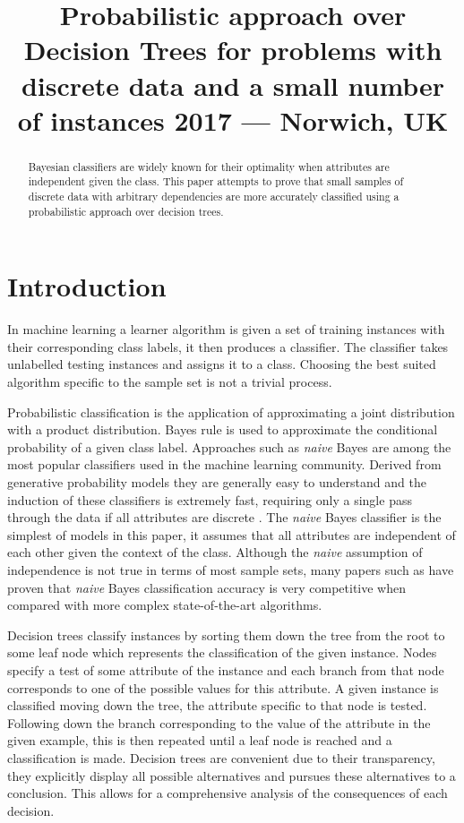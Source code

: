 \documentclass{cmppgr}
\title{Probabilistic approach over Decision Trees for problems with discrete data and a small number of instances 2017 --- Norwich, UK}
\begin{document}
\maketitle

\begin{abstract}

Bayesian classifiers are widely known for their optimality when attributes are independent given the class. This paper attempts to prove that small samples of discrete data with arbitrary dependencies are more accurately classified using a probabilistic approach over decision trees. 


\end{abstract}


\section{Introduction}

In machine learning a learner algorithm is given a set of training instances with their corresponding class labels, it then produces a classifier. The classifier takes unlabelled testing instances and assigns it to a class. Choosing the best suited algorithm specific to the sample set is not a trivial process.

Probabilistic classification is the application of approximating a joint distribution with a product distribution. Bayes rule is used to approximate the conditional probability of a given class label. Approaches such as \textit{naive} Bayes are among the most popular classifiers used in the machine learning community. Derived from generative probability models they are generally easy to understand and the induction of these classifiers is extremely fast, requiring only a single pass through the data if all attributes are discrete \cite{kohavi1996scaling}. The \textit{naive} Bayes classifier is the simplest of models in this paper, it assumes that all attributes are independent of each other given the context of the class. Although the \textit{naive} assumption of independence is not true in terms of most sample sets, many papers such as \cite{domingos1997optimality} have proven that \textit{naive} Bayes classification accuracy is very competitive when compared with more complex state-of-the-art algorithms. 

 

Decision trees classify instances by sorting them down the tree from the root to some leaf node which represents the classification of the given instance. Nodes specify a test of some attribute of the instance and each branch from that node corresponds to one of the possible values for this attribute. A given instance is classified moving down the tree, the attribute specific to that node is tested. Following down the branch corresponding to the value of the attribute in the given example, this is then repeated until a leaf node is reached and a classification is made. Decision trees are convenient due to their transparency, they explicitly display all possible alternatives and pursues these alternatives to a conclusion. This allows for a comprehensive analysis of the consequences of each decision.
\end{document}
